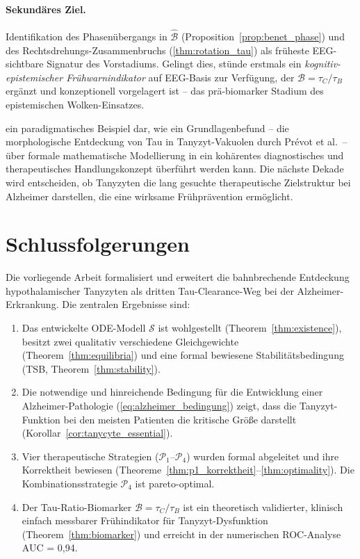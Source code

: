 ﻿\documentclass[12pt,a4paper]{article}
\theoremstyle{definition}
\begin{document}
	\paragraph{Sekundäres Ziel.}
	Identifikation des Phasenübergangs in $\hat{\mathcal{B}}$ (Proposition~\ref{prop:benet_phase}) und des Rechtsdrehungs-Zusammenbruchs (\cref{thm:rotation_tau}) als früheste EEG-sichtbare Signatur des Vorstadiums. Gelingt dies, stünde erstmals ein \emph{kognitiv-epistemischer Frühwarnindikator} auf EEG-Basis zur Verfügung, der $\mathcal{B} = \tau_C/\tau_B$ ergänzt und konzeptionell vorgelagert ist -- das prä-biomarker Stadium des epistemischen Wolken-Einsatzes.

	 ein paradigmatisches Beispiel dar, wie ein Grundlagenbefund -- die morphologische Entdeckung von Tau in Tanyzyt-Vakuolen durch Pr\'evot et al.\ -- über formale mathematische Modellierung in ein kohärentes diagnostisches und therapeutisches Handlungskonzept überführt werden kann. Die nächste Dekade wird entscheiden, ob Tanyzyten die lang gesuchte therapeutische Zielstruktur bei Alzheimer darstellen, die eine wirksame Frühprävention ermöglicht.
	
	\section{Schlussfolgerungen}
	
	Die vorliegende Arbeit formalisiert und erweitert die bahnbrechende Entdeckung hypothalamischer Tanyzyten als dritten Tau-Clearance-Weg bei der Alzheimer-Erkrankung. Die zentralen Ergebnisse sind:
	
	\begin{enumerate}[label=(\roman*)]
		\item Das entwickelte ODE-Modell $\mathcal{S}$ ist wohlgestellt (Theorem~\ref{thm:existence}), besitzt zwei qualitativ verschiedene Gleichgewichte (Theorem~\ref{thm:equilibria}) und eine formal bewiesene Stabilitätsbedingung (TSB, Theorem~\ref{thm:stability}).
		
		\item Die notwendige und hinreichende Bedingung für die Entwicklung einer Alzheimer-Pathologie (\cref{eq:alzheimer_bedingung}) zeigt, dass die Tanyzyt-Funktion bei den meisten Patienten die kritische Größe darstellt (Korollar~\ref{cor:tanycyte_essential}).
		
		\item Vier therapeutische Strategien ($\mathcal{P}_1$--$\mathcal{P}_4$) wurden formal abgeleitet und ihre Korrektheit bewiesen (Theoreme~\ref{thm:p1_korrektheit}--\ref{thm:optimality}). Die Kombinationsstrategie $\mathcal{P}_4$ ist pareto-optimal.
		
		\item Der Tau-Ratio-Biomarker $\mathcal{B} = \tau_C/\tau_B$ ist ein theoretisch validierter, klinisch einfach messbarer Frühindikator für Tanyzyt-Dysfunktion (Theorem~\ref{thm:biomarker}) und erreicht in der numerischen ROC-Analyse AUC = 0{,}94.
	\end{enumerate}
	
\end{document}
